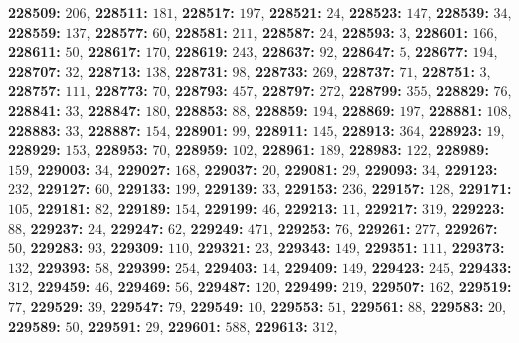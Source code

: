 \textsf{\bfseries 228509:} $206$, \textsf{\bfseries 228511:} $181$, \textsf{\bfseries 228517:} $197$, \textsf{\bfseries 228521:} $24$, \textsf{\bfseries 228523:} $147$, \textsf{\bfseries 228539:} $34$, \textsf{\bfseries 228559:} $137$, \textsf{\bfseries 228577:} $60$, \textsf{\bfseries 228581:} $211$, \textsf{\bfseries 228587:} $24$, \textsf{\bfseries 228593:} $3$, \textsf{\bfseries 228601:} $166$, \textsf{\bfseries 228611:} $50$, \textsf{\bfseries 228617:} $170$, \textsf{\bfseries 228619:} $243$, \textsf{\bfseries 228637:} $92$, \textsf{\bfseries 228647:} $5$, \textsf{\bfseries 228677:} $194$, \textsf{\bfseries 228707:} $32$, \textsf{\bfseries 228713:} $138$, \textsf{\bfseries 228731:} $98$, \textsf{\bfseries 228733:} $269$, \textsf{\bfseries 228737:} $71$, \textsf{\bfseries 228751:} $3$, \textsf{\bfseries 228757:} $111$, \textsf{\bfseries 228773:} $70$, \textsf{\bfseries 228793:} $457$, \textsf{\bfseries 228797:} $272$, \textsf{\bfseries 228799:} $355$, \textsf{\bfseries 228829:} $76$, \textsf{\bfseries 228841:} $33$, \textsf{\bfseries 228847:} $180$, \textsf{\bfseries 228853:} $88$, \textsf{\bfseries 228859:} $194$, \textsf{\bfseries 228869:} $197$, \textsf{\bfseries 228881:} $108$, \textsf{\bfseries 228883:} $33$, \textsf{\bfseries 228887:} $154$, \textsf{\bfseries 228901:} $99$, \textsf{\bfseries 228911:} $145$, \textsf{\bfseries 228913:} $364$, \textsf{\bfseries 228923:} $19$, \textsf{\bfseries 228929:} $153$, \textsf{\bfseries 228953:} $70$, \textsf{\bfseries 228959:} $102$, \textsf{\bfseries 228961:} $189$, \textsf{\bfseries 228983:} $122$, \textsf{\bfseries 228989:} $159$, \textsf{\bfseries 229003:} $34$, \textsf{\bfseries 229027:} $168$, \textsf{\bfseries 229037:} $20$, \textsf{\bfseries 229081:} $29$, \textsf{\bfseries 229093:} $34$, \textsf{\bfseries 229123:} $232$, \textsf{\bfseries 229127:} $60$, \textsf{\bfseries 229133:} $199$, \textsf{\bfseries 229139:} $33$, \textsf{\bfseries 229153:} $236$, \textsf{\bfseries 229157:} $128$, \textsf{\bfseries 229171:} $105$, \textsf{\bfseries 229181:} $82$, \textsf{\bfseries 229189:} $154$, \textsf{\bfseries 229199:} $46$, \textsf{\bfseries 229213:} $11$, \textsf{\bfseries 229217:} $319$, \textsf{\bfseries 229223:} $88$, \textsf{\bfseries 229237:} $24$, \textsf{\bfseries 229247:} $62$, \textsf{\bfseries 229249:} $471$, \textsf{\bfseries 229253:} $76$, \textsf{\bfseries 229261:} $277$, \textsf{\bfseries 229267:} $50$, \textsf{\bfseries 229283:} $93$, \textsf{\bfseries 229309:} $110$, \textsf{\bfseries 229321:} $23$, \textsf{\bfseries 229343:} $149$, \textsf{\bfseries 229351:} $111$, \textsf{\bfseries 229373:} $132$, \textsf{\bfseries 229393:} $58$, \textsf{\bfseries 229399:} $254$, \textsf{\bfseries 229403:} $14$, \textsf{\bfseries 229409:} $149$, \textsf{\bfseries 229423:} $245$, \textsf{\bfseries 229433:} $312$, \textsf{\bfseries 229459:} $46$, \textsf{\bfseries 229469:} $56$, \textsf{\bfseries 229487:} $120$, \textsf{\bfseries 229499:} $219$, \textsf{\bfseries 229507:} $162$, \textsf{\bfseries 229519:} $77$, \textsf{\bfseries 229529:} $39$, \textsf{\bfseries 229547:} $79$, \textsf{\bfseries 229549:} $10$, \textsf{\bfseries 229553:} $51$, \textsf{\bfseries 229561:} $88$, \textsf{\bfseries 229583:} $20$, \textsf{\bfseries 229589:} $50$, \textsf{\bfseries 229591:} $29$, \textsf{\bfseries 229601:} $588$, \textsf{\bfseries 229613:} $312$, 
